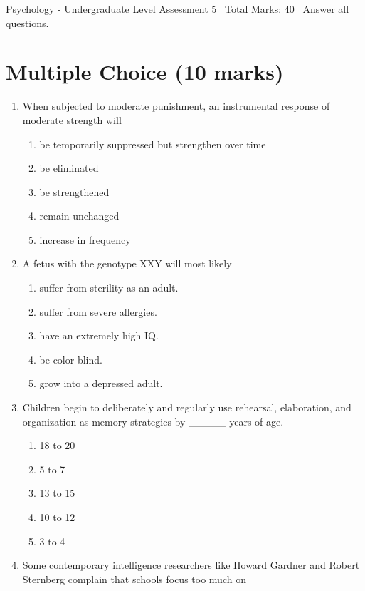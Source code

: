 \documentclass[12pt]{article}
\begin{document}
\begin{center}
Psychology - Undergraduate Level Assessment 5 \
Total Marks: 40 \
Answer all questions.
\end{center}

\section*{Multiple Choice (10 marks)}
\begin{enumerate}[label=\arabic*.]
\item When subjected to moderate punishment, an instrumental response of moderate strength will
\begin{enumerate}[label=(\alph*)]
    \item be temporarily suppressed but strengthen over time
    \item be eliminated
    \item be strengthened
    \item remain unchanged
    \item increase in frequency
\end{enumerate}
\item A fetus with the genotype XXY will most likely
\begin{enumerate}[label=(\alph*)]
    \item suffer from sterility as an adult.
    \item suffer from severe allergies.
    \item have an extremely high IQ.
    \item be color blind.
    \item grow into a depressed adult.
\end{enumerate}
\item Children begin to deliberately and regularly use rehearsal, elaboration, and organization
as memory strategies by \_\_\_\_\_ years of age.
\begin{enumerate}[label=(\alph*)]
    \item 18 to 20
    \item 5 to 7
    \item 13 to 15
    \item 10 to 12
    \item 3 to 4
\end{enumerate}
\item Some contemporary intelligence researchers like Howard Gardner and Robert Sternberg
complain that schools focus too much on
\begin{enumerate}[label=(\alph*)]

\end{enumerate}
\end{enumerate}
\end{document}
